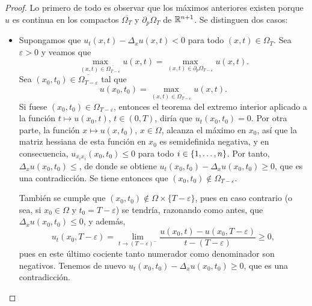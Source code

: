 \documentclass[a4paper, 12pt, extrafontsizes]{memoir}
\begin{document}
\begin{proof}
    Lo primero de todo es observar que los máximos anteriores existen porque $u$ es continua en los compactos $\overline{\Omega_T}$ y $\partial_p\Omega_T$ de $\mathbb R^{n+1}$. Se distinguen dos casos:
    \begin{itemize}
        \item Supongamos que $u_t(x,t)-\Delta_xu(x,t) < 0$ para todo $(x,t) \in \Omega_T$. Sea $\varepsilon > 0$ y veamos que
        \[\max_{(x,t)\in \overline{\Omega_{T-\varepsilon}}} u(x,t) = \max_{(x,t) \in \partial_p\Omega_{T-\varepsilon}}u(x,t).\]
        Sea $(x_0,t_0) \in \overline{\Omega_{T-\varepsilon}}$ tal que
        \[u(x_0,t_0) = \max_{(x,t)\in \overline{\Omega_{T-\varepsilon}}} u(x,t).\]
        Si fuese $(x_0,t_0) \in \Omega_{T-\varepsilon}$, entonces el teorema del extremo interior aplicado a la función $t \mapsto u(x_0,t)$, $t \in (0,T)$, diría que $u_t(x_0,t_0)=0$.
        Por otra parte, la función $x \mapsto u(x,t_0)$, $x \in \Omega$, alcanza el máximo en $x_0$, así que la matriz hessiana de esta función en $x_0$ es semidefinida negativa, y en consecuencia, $u_{x_ix_i}(x_0,t_0) \leq 0$ para todo $i \in \{1,\mathellipsis,n\}$. Por tanto, $\Delta_xu(x_0,t_0) \leq$, de donde se obtiene $u_t(x_0,t_0)-\Delta_xu(x_0,t_0) \geq 0$, que es una contradicción. Se tiene entonces que $(x_0,t_0) \not\in \Omega_{T-\varepsilon}$.

        También se cumple que $(x_0,t_0) \not\in \Omega \times \{T-\varepsilon\}$, pues en caso contrario (o sea, si $x_0 \in \Omega$ y $t_0=T-\varepsilon$) se tendría, razonando como antes, que $\Delta_xu(x_0,t_0) \leq 0$, y además,
        \[u_t(x_0,T-\varepsilon) = \lim_{t \to (T-\varepsilon)^{-}} \frac{u(x_0,t) - u(x_0,T-\varepsilon)}{t-(T-\varepsilon)} \geq 0,\]
        pues en este último cociente tanto numerador como denominador son negativos. Tenemos de nuevo $u_t(x_0,t_0)-\Delta_xu(x_0,t_0) \geq 0$, que es una contradicción.


\end{itemize}
\end{proof}
\end{document}
